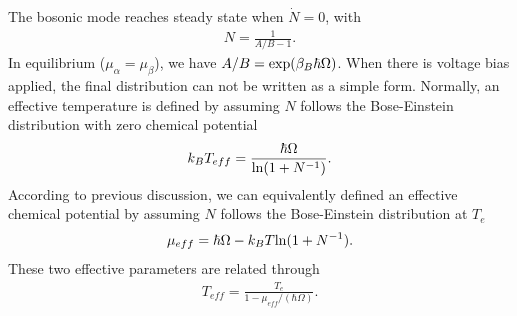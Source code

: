 \documentclass[aps
,twocolumn
,floatfix,footinbib,prl
]{revtex4-1}
\begin{document}
The bosonic mode reaches steady state when $\dot{N}=0$, with
\begin{align}
N = \frac{1}{A/B-1}.
\end{align}
In equilibrium ($\mu_\alpha=\mu_\beta$), we have $A/B={\rm exp}(\beta_B\hbar\Omega)$. When there is voltage bias applied, the final distribution can not be written as a simple form. Normally, an effective temperature is defined by assuming $N$ follows the Bose-Einstein distribution with zero chemical potential
\begin{align}
k_BT_{eff} = \frac{\hbar\Omega}{{\rm ln}(1+N^{-1})}.
\end{align}
According to previous discussion, we can equivalently defined an effective chemical potential by assuming $N$ follows the Bose-Einstein distribution at $T_e$ 
\begin{align}
\mu_{eff} = \hbar\Omega - k_BT{\rm ln}(1+N^{-1}).
\end{align}
These two effective parameters are related through
\begin{align}
T_{eff} = \frac{T_e}{1-\mu_{eff}/(\hbar\Omega)}.
\label{eq:tmu}
\end{align}
\end{document}
